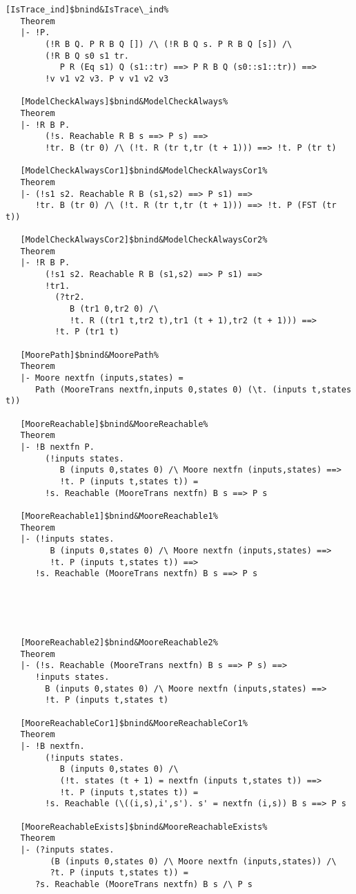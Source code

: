 \documentclass[12pt]{article}
\renewcommand{\t}[1]{\mbox{\tt #1}}
\begin{document}
\begin{footnotesize}
\begin{Verbatim}[commandchars=\$\&\%]
   [IsTrace_ind]$bnind&IsTrace\_ind%
   Theorem
   |- !P.
        (!R B Q. P R B Q []) /\ (!R B Q s. P R B Q [s]) /\
        (!R B Q s0 s1 tr.
           P R (Eq s1) Q (s1::tr) ==> P R B Q (s0::s1::tr)) ==>
        !v v1 v2 v3. P v v1 v2 v3

   [ModelCheckAlways]$bnind&ModelCheckAlways%
   Theorem
   |- !R B P.
        (!s. Reachable R B s ==> P s) ==>
        !tr. B (tr 0) /\ (!t. R (tr t,tr (t + 1))) ==> !t. P (tr t)
   
   [ModelCheckAlwaysCor1]$bnind&ModelCheckAlwaysCor1%
   Theorem
   |- (!s1 s2. Reachable R B (s1,s2) ==> P s1) ==>
      !tr. B (tr 0) /\ (!t. R (tr t,tr (t + 1))) ==> !t. P (FST (tr t))
   
   [ModelCheckAlwaysCor2]$bnind&ModelCheckAlwaysCor2%
   Theorem
   |- !R B P.
        (!s1 s2. Reachable R B (s1,s2) ==> P s1) ==>
        !tr1.
          (?tr2.
             B (tr1 0,tr2 0) /\
             !t. R ((tr1 t,tr2 t),tr1 (t + 1),tr2 (t + 1))) ==>
          !t. P (tr1 t)
   
   [MoorePath]$bnind&MoorePath%
   Theorem
   |- Moore nextfn (inputs,states) =
      Path (MooreTrans nextfn,inputs 0,states 0) (\t. (inputs t,states t))
   
   [MooreReachable]$bnind&MooreReachable%
   Theorem
   |- !B nextfn P.
        (!inputs states.
           B (inputs 0,states 0) /\ Moore nextfn (inputs,states) ==>
           !t. P (inputs t,states t)) =
        !s. Reachable (MooreTrans nextfn) B s ==> P s
   
   [MooreReachable1]$bnind&MooreReachable1%
   Theorem
   |- (!inputs states.
         B (inputs 0,states 0) /\ Moore nextfn (inputs,states) ==>
         !t. P (inputs t,states t)) ==>
      !s. Reachable (MooreTrans nextfn) B s ==> P s
   




   [MooreReachable2]$bnind&MooreReachable2%
   Theorem
   |- (!s. Reachable (MooreTrans nextfn) B s ==> P s) ==>
      !inputs states.
        B (inputs 0,states 0) /\ Moore nextfn (inputs,states) ==>
        !t. P (inputs t,states t)
   
   [MooreReachableCor1]$bnind&MooreReachableCor1%
   Theorem
   |- !B nextfn.
        (!inputs states.
           B (inputs 0,states 0) /\
           (!t. states (t + 1) = nextfn (inputs t,states t)) ==>
           !t. P (inputs t,states t)) =
        !s. Reachable (\((i,s),i',s'). s' = nextfn (i,s)) B s ==> P s
   
   [MooreReachableExists]$bnind&MooreReachableExists%
   Theorem
   |- (?inputs states.
         (B (inputs 0,states 0) /\ Moore nextfn (inputs,states)) /\
         ?t. P (inputs t,states t)) =
      ?s. Reachable (MooreTrans nextfn) B s /\ P s
   

\end{Verbatim}
\end{footnotesize}
\end{document}
